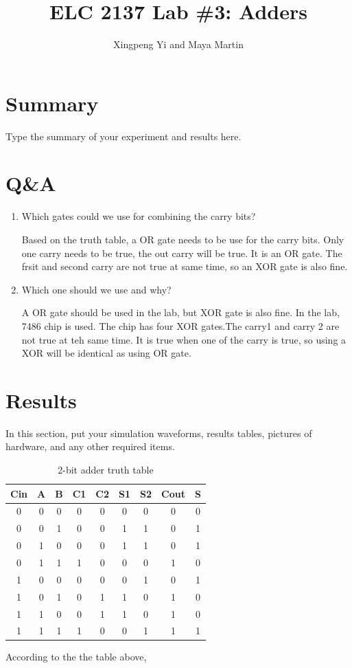 \documentclass[11pt]{article}
\begin{document}
\title{ELC 2137 Lab \#3: Adders}
\author{Xingpeng Yi and Maya Martin}

\maketitle


\section*{Summary}

Type the summary of your experiment and results here.  


\section*{Q\&A}

\begin{enumerate}
	\item  Which gates could we use for combining the carry bits?
	
	Based on the truth table, a OR gate needs to be use for the carry bits. Only one carry needs to be true, the out carry will be true. It is an OR gate. The frsit and second carry are not true at same time, so an XOR gate is also fine.
	
	\item Which one should we use and why?
	
	A OR gate should be used in the lab, but XOR gate is also fine. In the lab, 7486 chip is used.  The chip has four XOR gates.The carry1 and carry 2 are not true at teh same time. It is true when one of the carry is true, so using a XOR will be identical as using OR gate.
\end{enumerate}


\section*{Results}

In this section, put your simulation waveforms, results tables, pictures of hardware, and any other required items.\begin{table}[ht]\centering
	\caption{2-bit adder truth table}
	\label{tbl:example_table}
	\begin{tabular}{ccc|cc|cc|cc}
		\toprule
		Cin & A & B & C1 & C2 & S1 & S2 & Cout & S \\
		\midrule
		0 & 0 & 0 & 0 & 0 & 0 & 0 & 0 & 0\\
		0 & 0 & 1 & 0 & 0 & 1 & 1 & 0 & 1 \\
		0 & 1 & 0 & 0 & 0 & 1 & 1 & 0 & 1 \\
		0 & 1 & 1 & 1 & 0 & 0 & 0 & 1 & 0 \\
		1 & 0 & 0 & 0 & 0 & 0 & 1 & 0 & 1 \\
		1 & 0 & 1 & 0 & 1 & 1 & 0 & 1 & 0 \\
		1 & 1 & 0 & 0 & 1 & 1 & 0 & 1 & 0 \\
		1 & 1 & 1 & 1 & 0 & 0 & 1 & 1 & 1 \\
		\bottomrule
	\end{tabular} 
\end{table}
According to the the table above, 
\end{document}
